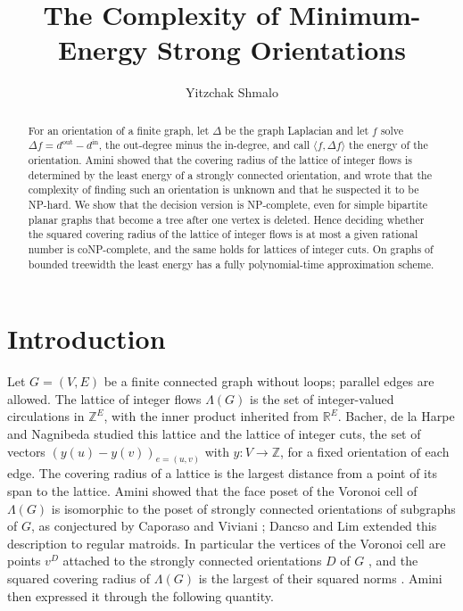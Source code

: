 \documentclass[11pt]{amsart}
\title[Minimum-energy strong orientations]{The Complexity of Minimum-Energy Strong Orientations}
\author[Yitzchak Shmalo]{Yitzchak Shmalo}
\theoremstyle{definition}
\theoremstyle{remark}
\numberwithin{equation}{section}
\newcommand{\Z}{\mathbb Z}
\newcommand{\R}{\mathbb R}
\begin{document}
\begin{abstract}
For an orientation of a finite graph, let $\Delta$ be the graph Laplacian and let $f$ solve $\Delta f=d^{\mathrm{out}}-d^{\mathrm{in}}$, the out-degree minus the in-degree, and call $\langle f,\Delta f\rangle$ the energy of the orientation. Amini showed that the covering radius of the lattice of integer flows is determined by the least energy of a strongly connected orientation, and wrote that the complexity of finding such an orientation is unknown and that he suspected it to be NP-hard. We show that the decision version is NP-complete, even for simple bipartite planar graphs that become a tree after one vertex is deleted. Hence deciding whether the squared covering radius of the lattice of integer flows is at most a given rational number is coNP-complete, and the same holds for lattices of integer cuts. On graphs of bounded treewidth the least energy has a fully polynomial-time approximation scheme.
\end{abstract}

\maketitle

\section{Introduction}

Let $G=(V,E)$ be a finite connected graph without loops; parallel edges are allowed. The lattice of integer flows $\Lambda(G)$ is the set of integer-valued circulations in $\Z^E$, with the inner product inherited from $\R^E$. Bacher, de la Harpe and Nagnibeda \cite{BHN97} studied this lattice and the lattice of integer cuts, the set of vectors $(y(u)-y(v))_{e=(u,v)}$ with $y\colon V\to\Z$, for a fixed orientation of each edge. The covering radius of a lattice is the largest distance from a point of its span to the lattice. Amini \cite[Theorem~1]{Amini} showed that the face poset of the Voronoi cell of $\Lambda(G)$ is isomorphic to the poset of strongly connected orientations of subgraphs of $G$, as conjectured by Caporaso and Viviani \cite{CV10}; Dancso and Lim \cite{DL22} extended this description to regular matroids. In particular the vertices of the Voronoi cell are points $v^D$ attached to the strongly connected orientations $D$ of $G$ \cite[Lemma~8]{Amini}, and the squared covering radius of $\Lambda(G)$ is the largest of their squared norms \cite[Proposition~12]{Amini}. Amini then expressed it through the following quantity.
\end{document}

